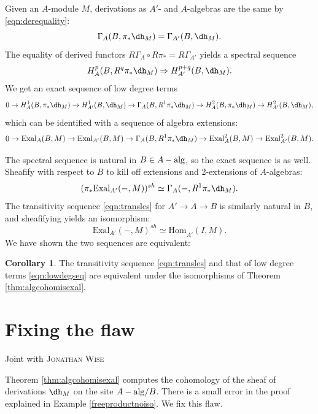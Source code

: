 \documentclass[11pt,reqno]{amsart}
\theoremstyle{definition}
\newtheorem{corollary}[theorem]{Corollary}
\newcommand{\HHom}{\underline{\textrm{Hom}}}
\newcommand{\dd}[1]{\dh_{#1}}
\newcommand{\Exal}{\textrm{Exal}}
\newcommand{\Aalg}{A-{\rm alg}}
\begin{document}
Given an $A$-module $M$, derivations as $A'$- and $A$-algebras are the same by \eqref{eqn:derequality}:
\[\Gamma_A(B, \pi_*\dd{M}) = \Gamma_{A'}(B, \dd{M}).\]
The equality of derived functors $R\Gamma_A \circ R\pi_* = R\Gamma_{A'}$ yields a spectral sequence
\[H^p_A(B, R^q \pi_* \dd{M}) \Rightarrow H^{p+q}_{A'}(B, \dd{M}).\]
We get an exact sequence of low degree terms
\begin{equation}\label{eqn:lowdegseq}
0 \to H^1_A(B, \pi_*\dd{M}) \to H^1_{A'}(B, \dd{M}) \to \Gamma_A(B, R^1\pi_* \dd{M}) \to H^2_A(B, \pi_*\dd{M}) \to H^2_{A'}(B, \dd{M}),    
\end{equation}
which can be identified with a sequence of algebra extensions:
\begin{equation}\label{eqn:exallesfromss}
0 \to \Exal_A(B, M) \to \Exal_{A'}(B, M) \to \Gamma_A(B, R^1 \pi_* \dd{M}) \to \Exal^2_A(B, M) \to \Exal^2_{A'}(B, M).    
\end{equation}

The spectral sequence is natural in $B \in \Aalg$, so the exact sequence is as well. Sheafify with respect to $B$ to kill off extensions and 2-extensions of $A$-algebras:
\[(\pi_*\Exal_{A'}(-, M))^{sh} \simeq \Gamma_A(-, R^1\pi_* \dd{M}).\]
The transitivity sequence \eqref{eqn:transles} for $A' \to A \to B$ is similarly natural in $B$, and sheafifying yields an isomorphism:
\[\Exal_{A'}(-, M)^{sh} \simeq \HHom_{A'}(I, M).\]
We have shown the two sequences are equivalent:


\begin{corollary}
The transitivity sequence \eqref{eqn:transles} and that of low degree terms \eqref{eqn:lowdegseq} are equivalent under the isomorphisms of Theorem \ref{thm:algcohomisexal}. 
\end{corollary}



\appendix


\section{Fixing the flaw}\label{a:fixflaw}
\smallskip
\begin{center}Joint with \textsc{Jonathan Wise}\end{center}
\medskip

Theorem \ref{thm:algcohomisexal} computes the cohomology of the sheaf of derivations $\dd{M}$ on the site $\Aalg/B$. There is a small error in the proof explained in Example \ref{freeproductnoiso}. We fix this flaw. 
\end{document}
